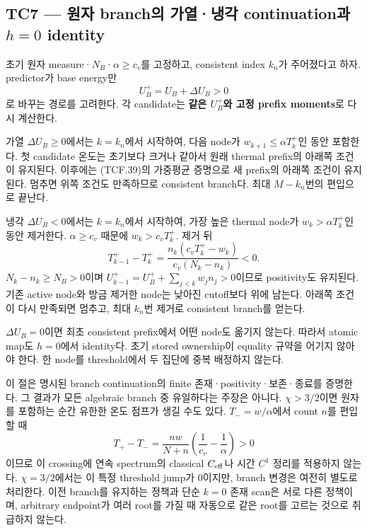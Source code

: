 \hypertarget{tc7-uxc6d0uxc790-branchuxc758-uxac00uxc5f4uxb0c9uxac01-continuationuxacfc-h0-identity}{%
\subsection{\texorpdfstring{TC7 --- 원자 branch의 가열·냉각 continuation과 \(h=0\) identity}{TC7 --- 원자 branch의 가열·냉각 continuation과 h=0 identity}}\label{tc7-uxc6d0uxc790-branchuxc758-uxac00uxc5f4uxb0c9uxac01-continuationuxacfc-h0-identity}}

초기 원자 measure·\(N_B\)·\(\alpha\ge c_v\)를 고정하고, consistent index \(k_n\)가 주어졌다고 하자. predictor가 base energy만 \[
U_B^+=U_B+\Delta U_B>0
\tag{TCF.41}
\] 로 바꾸는 경로를 고려한다. 각 candidate는 \textbf{같은 \(U_B^+\)와 고정 prefix moments}로 다시 계산한다.

가열 \(\Delta U_B\ge0\)에서는 \(k=k_n\)에서 시작하여, 다음 node가 \(w_{k+1}\le\alpha T_k^+\)인 동안 포함한다. 첫 candidate 온도는 초기보다 크거나 같아서 원래 thermal prefix의 아래쪽 조건이 유지된다. 이후에는 (TCF.39)의 가중평균 증명으로 새 prefix의 아래쪽 조건이 유지된다. 멈추면 위쪽 조건도 만족하므로 consistent branch다. 최대 \(M-k_n\)번의 편입으로 끝난다.

냉각 \(\Delta U_B<0\)에서는 \(k=k_n\)에서 시작하여, 가장 높은 thermal node가 \(w_k>\alpha T_k^+\)인 동안 제거한다. \(\alpha\ge c_v\) 때문에 \(w_k>c_vT_k^+\). 제거 뒤 \[
T_{k-1}^+-T_k^+
=\frac{n_k(c_vT_k^+-w_k)}{c_v(N_k-n_k)}<0 .
\tag{TCF.42}
\] \(N_k-n_k\ge N_B>0\)이며 \(U_{k-1}^+=U_B^++\sum_{j<k}w_jn_j>0\)이므로 positivity도 유지된다. 기존 active node와 방금 제거한 node는 낮아진 cutoff보다 위에 남는다. 아래쪽 조건이 다시 만족되면 멈추고, 최대 \(k_n\)번 제거로 consistent branch를 얻는다.

\(\Delta U_B=0\)이면 최초 consistent prefix에서 어떤 node도 옮기지 않는다. 따라서 atomic map도 \(h=0\)에서 identity다. 초기 stored ownership이 equality 규약을 어기지 않아야 한다. 한 node를 threshold에서 두 집단에 중복 배정하지 않는다.

이 절은 명시된 branch continuation의 finite 존재·positivity·보존·종료를 증명한다. 그 결과가 모든 algebraic branch 중 유일하다는 주장은 아니다. \(\chi>3/2\)이면 원자를 포함하는 순간 유한한 온도 점프가 생길 수도 있다. \(T_-=w/\alpha\)에서 count \(n\)를 편입할 때 \[
T_+-T_-=
\frac{nw}{N+n}\left(\frac1{c_v}-\frac1\alpha\right)>0
\tag{TCF.43}
\] 이므로 이 crossing에 연속 spectrum의 classical \(C_{\rm eff}\)나 시간 \(C^1\) 정리를 적용하지 않는다. \(\chi=3/2\)에서는 이 특정 threshold jump가 0이지만, branch 변경은 여전히 별도로 처리한다. 이전 branch를 유지하는 정책과 단순 \(k=0\) 존재 scan은 서로 다른 정책이며, arbitrary endpoint가 여러 root를 가질 때 자동으로 같은 root를 고르는 것으로 취급하지 않는다.

